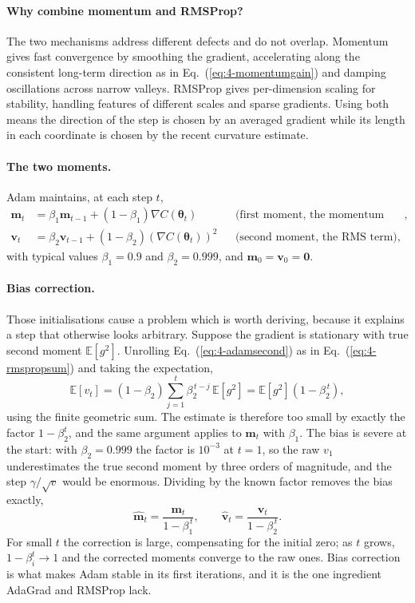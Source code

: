\paragraph{Why combine momentum and RMSProp?}
The two mechanisms address different defects and do not overlap.  Momentum
gives fast convergence by smoothing the gradient, accelerating along the
consistent long-term direction as in Eq.~(\ref{eq:4-momentumgain}) and damping
oscillations across narrow valleys.  RMSProp gives per-dimension scaling for
stability, handling features of different scales and sparse gradients.  Using
both means the direction of the step is chosen by an averaged gradient while
its length in each coordinate is chosen by the recent curvature estimate.

\paragraph{The two moments.}
Adam maintains, at each step $t$,
\begin{align}
  \bm{m}_t &= \beta_1\bm{m}_{t-1} + (1-\beta_1)\nabla C(\bm{\theta}_t)
   && \text{(first moment, the momentum term)},
  \label{eq:4-adamfirst}\\
  \bm{v}_t &= \beta_2\bm{v}_{t-1}
    + (1-\beta_2)\left(\nabla C(\bm{\theta}_t)\right)^{2}
   && \text{(second moment, the RMS term)},
  \label{eq:4-adamsecond}
\end{align}
with typical values $\beta_1=0.9$ and $\beta_2=0.999$, and
$\bm{m}_0=\bm{v}_0=\bm{0}$.

\paragraph{Bias correction.}
Those initialisations cause a problem which is worth deriving, because it
explains a step that otherwise looks arbitrary.  Suppose the gradient is
stationary with true second moment $\mathbb{E}[g^{2}]$.  Unrolling
Eq.~(\ref{eq:4-adamsecond}) as in Eq.~(\ref{eq:4-rmspropsum}) and taking the
expectation,
\begin{equation}
  \mathbb{E}[v_t] = (1-\beta_2)\sum_{j=1}^{t}\beta_2^{\,t-j}\,\mathbb{E}[g^{2}]
   = \mathbb{E}[g^{2}]\left(1-\beta_2^{\,t}\right),
  \label{eq:4-adambiasderiv}
\end{equation}
using the finite geometric sum.  The estimate is therefore too small by
exactly the factor $1-\beta_2^{t}$, and the same argument applies to
$\bm{m}_t$ with $\beta_1$.  The bias is severe at the start: with
$\beta_2=0.999$ the factor is $10^{-3}$ at $t=1$, so the raw $v_1$ underestimates
the true second moment by three orders of magnitude, and the step
$\gamma/\sqrt{v}$ would be enormous.  Dividing by the known factor removes the
bias exactly,
\begin{equation}
  \hat{\bm{m}}_t = \frac{\bm{m}_t}{1-\beta_1^{\,t}},
  \qquad
  \hat{\bm{v}}_t = \frac{\bm{v}_t}{1-\beta_2^{\,t}} .
  \label{eq:4-adambias}
\end{equation}
For small $t$ the correction is large, compensating for the initial zero; as
$t$ grows, $1-\beta_i^{t}\to1$ and the corrected moments converge to the raw
ones.  Bias correction is what makes Adam stable in its first iterations, and
it is the one ingredient AdaGrad and RMSProp lack.

